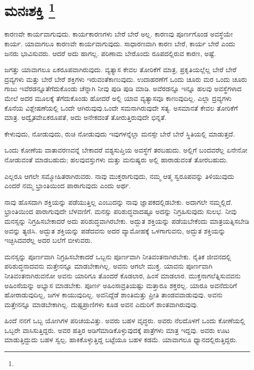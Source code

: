 
\chapter[ಮನಃಶಕ್ತಿ ]{ಮನಃಶಕ್ತಿ \protect\footnote{}}

ಕಾರಣವೇ ಕಾರ್ಯವಾಗುವುದು. ಕಾರ್ಯಕಾರಣಗಳು ಬೇರೆ ಬೇರೆ ಅಲ್ಲ. ಕಾರಣವು ಪೂರ್ಣಗೊಂಡ ಅವಸ್ಥೆಯೇ ಕಾರ್ಯ. ಯಾವಾಗಲೂ ಕಾರಣವೇ ಕಾರ್ಯವಾಗುವುದು. ಸಾಧಾರಣವಾಗಿ ಕಾರಣ ಬೇರೆ, ಕಾರ್ಯ ಬೇರೆ ಎಂದು ಜನರು ಭಾವಿಸುವರು. ಆದರೆ ಅದು ಹಾಗಲ್ಲ. ಪರಿಣಾಮ ಬೇರೊಂದು ರೂಪದಲ್ಲಿರುವ ಕಾರಣ, ಅಷ್ಟೆ.

ಜಗತ್ತು ಯಾವಾಗಲೂ ಏಕರೂಪವಾಗಿರುವುದು. ವ್ಯತ್ಯಾಸ ಕೇವಲ ತೋರಿಕೆಗೆ ಮಾತ್ರ, ಪ್ರಕೃತಿಯಲ್ಲೆಲ್ಲ ಬೇರೆ ಬೇರೆ ದ್ರವ್ಯಗಳು ಮತ್ತು ಬೇರೆ ಬೇರೆ ಶಕ್ತಿಗಳು ಇರುವಂತೆ\break ಕಾಣುವುದು. ಉದಾಹರಣೆಗೆ ಒಂದು ಚೂರು ಮರ ಒಂದು ಚೂರು ಗಾಜು ಇವೆರಡನ್ನೂ\break ತೆಗೆದುಕೊಂಡು ಚೆನ್ನಾಗಿ ನೀವು ಪುಡಿ ಪುಡಿ ಮಾಡಿ. ಅವೆರಡನ್ನೂ ಇನ್ನೂ ಹಲವು ಅವಸ್ಥೆಗಳಾದ ಮೇಲೆ ಅದರ ಮೂಲಕ್ಕೆ ತೆಗೆದುಕೊಂಡು ಹೋದರೆ ಅಲ್ಲಿ ಯಾವ ವ್ಯತ್ಯಾಸವೂ ಕಾಣುವುದಿಲ್ಲ. ಎಲ್ಲಾ ದ್ರವ್ಯಗಳು ಕೊನೆಯ ವಿಶ್ಲೇಷಣೆಯಲ್ಲಿ ಒಂದೇ ಆಗಿರುವುವು.\break ಒಂದೇ ಸಮನಾಗಿರುವುದೇ ಸತ್ಯ. ಅಸಮಾನತೆ ಕೇವಲ ತೋರಿಕೆಗೆ ಮಾತ್ರ. ಅದ್ವೈತವೇ\break ಏಕರೂಪತೆ, ಅದು ಅನೇಕದಂತೆ ತೋರುತ್ತಿರುವುದೇ ಭಿನ್ನತೆ.

ಕೇಳುವುದು, ನೋಡುವುದು, ರುಚಿ ನೋಡುವುದು ಇವುಗಳನ್ನೆಲ್ಲಾ ಮನಸ್ಸೇ ಬೇರೆ ಬೇರೆ ಸ್ಥಿತಿಯಲ್ಲಿ ಮಾಡುತ್ತದೆ.

ಒಂದು ಕೋಣೆಯ ವಾತಾವರಣವನ್ನೆ ಬೇಕಾದರೆ ವಶ್ಯಸುಪ್ತಿಯ ಅವಸ್ಥೆಗೆ ತರಬಹುದು. ಅಲ್ಲಿಗೆ ಬಂದವರೆಲ್ಲ ಏನೇನೋ ನೋಡುವಂತೆ ಮಾಡಬಹುದು; ಹಲವು\break ವಸ್ತುಗಳು ಮತ್ತು ಮನುಷ್ಯರು ಅಲ್ಲಿ ಹಾರಾಡುವಂತೆ ತೋರಬಹುದು.

ಎಲ್ಲರೂ ಆಗಲೇ ಸಮ್ಮೋಹಿತರಾಗಿರುವರು. ನಾವು ಮುಕ್ತರಾಗುವುದು, ನಮ್ಮ ಆತ್ಮ ಸ್ವರೂಪವನ್ನು ತಿಳಿಯುವುದು ಎಂದರೆ ನಮ್ಮ ಭ್ರಾಂತಿಯಿಂದ ಪಾರಾಗುವುದು ಎಂದು ಅರ್ಥ.

ನಾವು ಹೊಸದಾಗಿ ಶಕ್ತಿಯನ್ನು ಪಡೆಯುತ್ತಿಲ್ಲ ಎಂಬುದನ್ನು ನಾವು ಜ್ಞಾಪಕದಲ್ಲಿಡಬೇಕು. ಅದಾಗಲೇ ನಮ್ಮಲ್ಲಿದೆ. ಭ್ರಾಂತಿಯಿಂದ ಪಾರಾಗುವುದೇ ಬೆಳವಣಿಗೆ. ಮನಸ್ಸು ಪರಿಶುದ್ಧವಾದಷ್ಟೂ ಅದನ್ನು ನಿಗ್ರಹಿಸುವುದು ಸುಲಭ. ನೀವು ಮನಸ್ಸನ್ನು ನಿಗ್ರಹಿಸಬೇಕಾದರೆ ಅದು ಪರಿಶುದ್ಧವಾಗಿರಬೇಕು. ಅದ್ಭುತ ಶಕ್ತಿಯನ್ನು ಪಡೆಯಬೇಕೆಂದು ಮಾತ್ರ\break ಯತ್ನಿಸಬೇಡಿ ಅವನ್ನು ತ್ಯಜಿಸಿ. ಅದ್ಭುತ ಶಕ್ತಿಯನ್ನು ಪಡೆದವನು ಅದರ ವ್ಯಾಮೋಹಕ್ಕೆ ಒಳಗಾಗುವನು, ಅದ್ಭುತ ಶಕ್ತಿಯನ್ನು ಇಚ್ಛಿಸಿದವರೆಲ್ಲ ಅದರ ಬಲೆಗೆ ಬೀಳುವರು.

ಮನಸ್ಸನ್ನು ಪೂರ್ಣವಾಗಿ ನಿಗ್ರಹಿಸಬೇಕಾದರೆ ಒಬ್ಬನು ಪೂರ್ಣವಾಗಿ ನೀತಿವಂತನಾಗಿರಬೇಕು. ನೈತಿಕ ಜೀವನದಲ್ಲಿ ಪರಿಶುದ್ಧನಾದವನು ಮತ್ತೇನನ್ನೂ ಮಾಡಬೇಕಾಗಿಲ್ಲ. ಅವನು ಆಗಲೇ ಮುಕ್ತ. ಯಾವನು ಪೂರ್ಣವಾಗಿ ನೀತಿವಂತನಾಗಿರುವನೋ ಅವನು ಯಾರಿಗೂ ತೊಂದರೆ ಕೊಡಲಾರ, ಹಿಂಸೆ ಮಾಡಲಾರ. ಮುಕ್ತನಾಗಲೆತ್ನಿಸುವವನು ಅಹಿಂಸೆಯನ್ನು ಅಭ್ಯಾಸ ಮಾಡಬೇಕು. ಪೂರ್ಣ ಅಹಿಂಸಾವ್ರತಿಯಷ್ಟು ಮತ್ತಾರೂ ಶಕ್ತರಲ್ಲ. ಯಾರೂ ಅವನೆದುರಿಗೆ ಹೋರಾಡುವುದಿಲ್ಲ, ಜಗಳ ಕಾಯುವುದಿಲ್ಲ. ಅವನಿದ್ದೆಡೆ ಶಾಂತಿ\break ಮತ್ತು ಪ್ರೀತಿ ತಾಂಡವವಾಡುವುವು. ಅವನು ಮತ್ತೇನನ್ನೂ ಮಾಡಬೇಕಾಗಿಲ್ಲ. ದುಷ್ಟ\break ಪ್ರಾಣಿಗಳು ಕೂಡ ಅವನ ಎದುರಿಗೆ ಶಾಂತವಾಗಿರುವುವು.

ಹಿಂದೆ ನನಗೆ ಒಬ್ಬ ಯೋಗಿಗಳ ಪರಿಚಯವಿತ್ತು. ಅವರು ಬಹಳ ವೃದ್ಧರು. ಅವರು ನೆಲದೊಳಗೆ ಒಂದು ಕೋಣೆಯಲ್ಲಿ ಒಬ್ಬರೇ ವಾಸಿಸುತ್ತಿದ್ದರು. ಅವರ ಹತ್ತಿರ ಅಡಿಗೆ\break ಮಾಡಿಕೊಳ್ಳುವುದಕ್ಕೆ ಪಾತ್ರೆಗಳು ಮಾತ್ರ ಇದ್ದವು. ಅವರು ಊಟ ಮಾಡುತ್ತಿದ್ದುದು ಬಹಳ ಸ್ವಲ್ಪ. ಹಾಕಿಕೊಳ್ಳುತ್ತಿದ್ದ ಬಟ್ಟೆಯೂ ಬಹಳ ಕಡಮೆ. ಯಾವಾಗಲೂ ಧ್ಯಾನದಲ್ಲಿರುತ್ತಿದ್ದರು.

